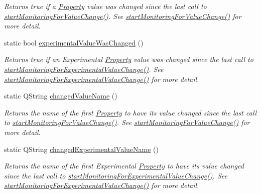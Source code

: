 \begin{DoxyCompactItemize}
\begin{DoxyCompactList}\small\item\em Returns true if a \hyperlink{class_picto_1_1_property}{Property} value was changed since the last call to \hyperlink{class_picto_1_1_property_a59b424f90e965db678b0fe4f8702eb5d}{start\-Monitoring\-For\-Value\-Change()}. See \hyperlink{class_picto_1_1_property_a59b424f90e965db678b0fe4f8702eb5d}{start\-Monitoring\-For\-Value\-Change()} for more detail. \end{DoxyCompactList}\item 
\hypertarget{class_picto_1_1_property_ae384ed764c9cb982d8492376c3f490b7}{static bool \hyperlink{class_picto_1_1_property_ae384ed764c9cb982d8492376c3f490b7}{experimental\-Value\-Was\-Changed} ()}\label{class_picto_1_1_property_ae384ed764c9cb982d8492376c3f490b7}

\begin{DoxyCompactList}\small\item\em Returns true if an Experimental \hyperlink{class_picto_1_1_property}{Property} value was changed since the last call to \hyperlink{class_picto_1_1_property_a2421feb1da0092567df8dd7bf1e2ea89}{start\-Monitoring\-For\-Experimental\-Value\-Change()}. See \hyperlink{class_picto_1_1_property_a2421feb1da0092567df8dd7bf1e2ea89}{start\-Monitoring\-For\-Experimental\-Value\-Change()} for more detail. \end{DoxyCompactList}\item 
\hypertarget{class_picto_1_1_property_aa5eee2c9c28954c9dc430d449eda4689}{static Q\-String \hyperlink{class_picto_1_1_property_aa5eee2c9c28954c9dc430d449eda4689}{changed\-Value\-Name} ()}\label{class_picto_1_1_property_aa5eee2c9c28954c9dc430d449eda4689}

\begin{DoxyCompactList}\small\item\em Returns the name of the first \hyperlink{class_picto_1_1_property}{Property} to have its value changed since the last call to \hyperlink{class_picto_1_1_property_a59b424f90e965db678b0fe4f8702eb5d}{start\-Monitoring\-For\-Value\-Change()}. See \hyperlink{class_picto_1_1_property_a59b424f90e965db678b0fe4f8702eb5d}{start\-Monitoring\-For\-Value\-Change()} for more detail. \end{DoxyCompactList}\item 
\hypertarget{class_picto_1_1_property_ac40642a7f88c066d229df9e8285e3f49}{static Q\-String \hyperlink{class_picto_1_1_property_ac40642a7f88c066d229df9e8285e3f49}{changed\-Experimental\-Value\-Name} ()}\label{class_picto_1_1_property_ac40642a7f88c066d229df9e8285e3f49}

\begin{DoxyCompactList}\small\item\em Returns the name of the first Experimental \hyperlink{class_picto_1_1_property}{Property} to have its value changed since the last call to \hyperlink{class_picto_1_1_property_a2421feb1da0092567df8dd7bf1e2ea89}{start\-Monitoring\-For\-Experimental\-Value\-Change()}. See \hyperlink{class_picto_1_1_property_a2421feb1da0092567df8dd7bf1e2ea89}{start\-Monitoring\-For\-Experimental\-Value\-Change()} for more detail. \end{DoxyCompactList}\end{DoxyCompactItemize}
